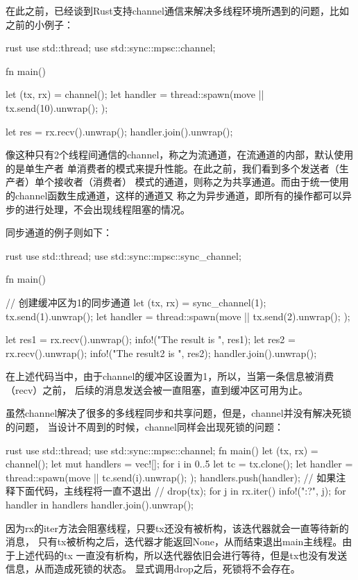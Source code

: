 在此之前，已经谈到Rust支持channel通信来解决多线程环境所遇到的问题，比如之前的小例子：
\begin{code-block}{rust}
use std::thread;
use std::sync::mpsc::channel;

fn main() {
    let (tx, rx) = channel();
    let handler = thread::spawn(move || {
        tx.send(10).unwrap();
    });

    let res = rx.recv().unwrap();
    handler.join().unwrap();
}
\end{code-block}
像这种只有2个线程间通信的channel，称之为流通道，在流通道的内部，默认使用的是单生产者
单消费者的模式来提升性能。在此之前，我们看到多个发送者（生产者）单个接收者（消费者）
模式的通道，则称之为共享通道。而由于统一使用的channel函数生成通道，这样的通道又
称之为异步通道，即所有的操作都可以异步的进行处理，不会出现线程阻塞的情况。

同步通道的例子则如下：
\begin{code-block}{rust}
use std::thread;
use std::sync::mpsc::sync_channel;

fn main() {
    // 创建缓冲区为1的同步通道
    let (tx, rx) = sync_channel(1);
    tx.send(1).unwrap();
    let handler = thread::spawn(move || {
        tx.send(2).unwrap();
    });

    let res1 = rx.recv().unwrap();
    info!("The result is {}", res1);
    let res2 = rx.recv().unwrap();
    info!("The result2 is {}", res2);
    handler.join().unwrap();
}
\end{code-block}
在上述代码当中，由于channel的缓冲区设置为1，所以，当第一条信息被消费（recv）之前，
后续的消息发送会被一直阻塞，直到缓冲区可用为止。

虽然channel解决了很多的多线程同步和共享问题，但是，channel并没有解决死锁的问题，
当设计不周到的时候，channel同样会出现死锁的问题：
\begin{code-block}{rust}
use std::thread;
use std::sync::mpsc::channel;
fn main() {
    let (tx, rx) = channel();
    let mut handlers = vec![];
    for i in 0..5 {
        let tc = tx.clone();
        let handler = thread::spawn(move || {
            tc.send(i).unwrap();
        });
        handlers.push(handler);
    }
    // 如果注释下面代码，主线程将一直不退出
    // drop(tx);
    for j in rx.iter() {
        info!("{:?}", j);
    }
    for handler in handlers {
        handler.join().unwrap();
    }
}
\end{code-block}
因为rx的iter方法会阻塞线程，只要tx还没有被析构，该迭代器就会一直等待新的消息，
只有tx被析构之后，迭代器才能返回None，从而结束退出main主线程。由于上述代码的tx
一直没有析构，所以迭代器依旧会进行等待，但是tx也没有发送信息，从而造成死锁的状态。
显式调用drop之后，死锁将不会存在。


